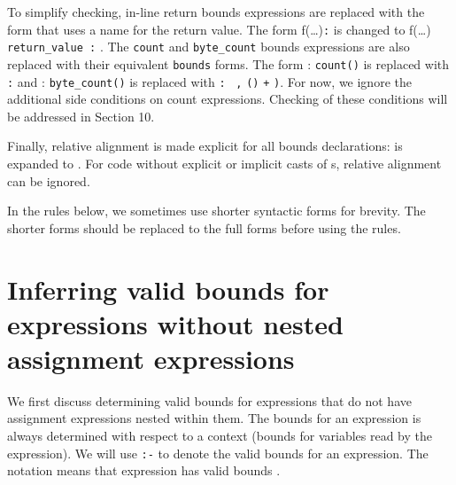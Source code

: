 To simplify checking, in-line return bounds expressions are replaced
with the form that uses a name for the return value. The form
f(\ldots{})\texttt{:}  is changed to f(\ldots{}) 
\texttt{return\_value :} . The \texttt{count} and
\texttt{byte\_count} bounds expressions are also replaced with their
equivalent \texttt{bounds} forms. The form  :
\texttt{count(}\texttt{)} is replaced with  \texttt{:}
 and  :
\texttt{byte\_count(}\texttt{)} is replaced with 
\texttt{:} \arrayptrchar\
\texttt{,} \texttt{(\arrayptrchar )}
\var{x} \texttt{+} \texttt{)}. For now, we ignore the
additional side conditions on count expressions. Checking of these
conditions will be addressed in Section 10.

Finally, relative alignment is made explicit for all bounds
declarations:  is expanded to
.
For code without explicit or implicit casts of \arrayptr s, relative
alignment can be ignored.

In the rules below, we sometimes use shorter syntactic forms for
brevity. The shorter forms should be replaced to the full forms before
using the rules.

\section{Inferring valid bounds for expressions without nested assignment expressions}\label{inferring-valid-bounds-for-expressions-without-nested-assignment-expressions}

We first discuss determining valid bounds for expressions that do not
have assignment expressions nested within them. The bounds for an
expression is always determined with respect to a context (bounds for
variables read by the expression). We will use \texttt{:-} to denote the
valid bounds for an expression. The notation 
means that expression \var{e} has valid bounds \var{bounds-exp}.

